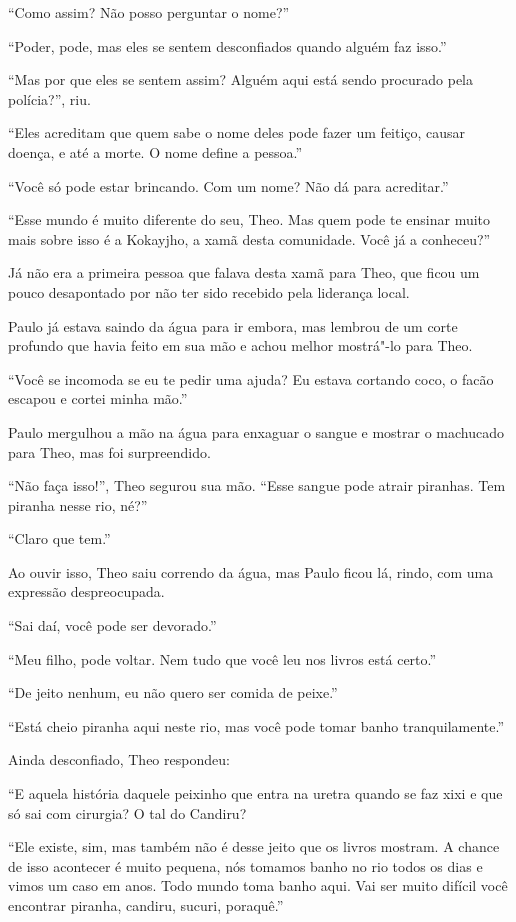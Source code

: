 ``Como assim? Não posso perguntar o nome?''

``Poder, pode, mas eles se sentem desconfiados quando alguém faz isso.''

``Mas por que eles se sentem assim? Alguém aqui está sendo procurado pela
polícia?'', riu.

``Eles acreditam que quem sabe o nome deles pode fazer um feitiço,
causar doença, e até a morte. O nome define a pessoa.''

``Você só pode estar brincando. Com um nome? Não dá para acreditar.''

``Esse mundo é muito diferente do seu, Theo. Mas quem pode te ensinar
muito mais sobre isso é a Kokayjho, a xamã desta comunidade. Você já a
conheceu?''

Já não era a primeira pessoa que falava desta xamã para Theo, que ficou
um pouco desapontado por não ter sido recebido pela liderança local.

Paulo já estava saindo da água para ir embora, mas lembrou de um corte
profundo que havia feito em sua mão e achou melhor mostrá"-lo para Theo.

``Você se incomoda se eu te pedir uma ajuda? Eu estava cortando coco, o
facão escapou e cortei minha mão.''

Paulo mergulhou a mão na água para enxaguar o sangue e mostrar o
machucado para Theo, mas foi surpreendido.

``Não faça isso!'', Theo segurou sua mão. ``Esse sangue pode atrair
piranhas. Tem piranha nesse rio, né?''

``Claro que tem.''

Ao ouvir isso, Theo saiu correndo da água, mas Paulo ficou lá, rindo,
com uma expressão despreocupada.

``Sai daí, você pode ser devorado.''

``Meu filho, pode voltar. Nem tudo que você leu nos livros está certo.''

``De jeito nenhum, eu não quero ser comida de peixe.''

``Está cheio piranha aqui neste rio, mas você pode tomar banho
tranquilamente.''

Ainda desconfiado, Theo respondeu:

``E aquela história daquele peixinho que entra na uretra quando se faz xixi
e que só sai com cirurgia? O tal do Candiru?

``Ele existe, sim, mas também não é desse jeito que os livros mostram. A
chance de isso acontecer é muito pequena, nós tomamos banho no rio todos
os dias e vimos um caso em anos. Todo mundo toma banho aqui. Vai ser
muito difícil você encontrar piranha, candiru, sucuri, poraquê.''

